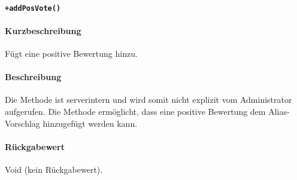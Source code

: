 \paragraph*{\texttt{+addPosVote()}}%
\paragraph*{Kurzbeschreibung}
Fügt eine positive Bewertung hinzu.
\paragraph*{Beschreibung}
Die Methode ist serverintern und wird somit nicht explizit vom Administrator aufgerufen.
Die Methode ermöglicht, dass eine positive Bewertung dem Alias-Vorschlag hinzugefügt werden kann.
\paragraph*{Rückgabewert}
Void (kein Rückgabewert).
